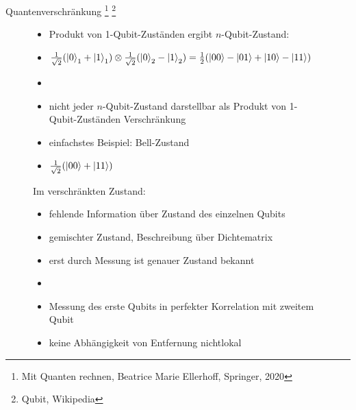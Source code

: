 \documentclass[aspectratio=1610, 9pt]{beamer}
\begin{document}
\begin{frame}{Quantenverschränkung \footnote[14]{Mit Quanten rechnen, Beatrice Marie Ellerhoff, Springer, 2020} \footnote[12]{Qubit, Wikipedia} }
  \begin{figure}
    \begin{minipage}{0.49\textwidth}
      \begin{itemize}
        \item Produkt von 1-Qubit-Zuständen ergibt $n$-Qubit-Zustand:
        \item[] $\frac{1}{\sqrt{2}}(\ket{0}_1 + \ket{1}_1) \otimes \frac{1}{\sqrt{2}}(\ket{0}_2 - \ket{1}_2) = \frac{1}{2}(\ket{00}-\ket{01}+\ket{10}-\ket{11} ) $
        \item[]
        \item nicht jeder $n$-Qubit-Zustand darstellbar als Produkt von 1-Qubit-Zuständen \rightarrow Verschränkung
        \item einfachstes Beispiel: Bell-Zustand
        \item[] $\frac{1}{\sqrt{2}}(\ket{00} + \ket{11})$
      \end{itemize}
    \end{minipage}
    \hfill
    \begin{minipage}{0.49\textwidth}
      Im verschränkten Zustand:
      \begin{itemize}
        \item fehlende Information über Zustand des einzelnen Qubits
        \item[\rightarrow] gemischter Zustand, Beschreibung über Dichtematrix
        \item erst durch Messung ist genauer Zustand bekannt
        \item[]
        \item Messung des erste Qubits in perfekter Korrelation mit zweitem Qubit
        \item keine Abhängigkeit von Entfernung \rightarrow nichtlokal
      \end{itemize}
    \end{minipage}
  \end{figure}
\end{frame}
\end{document}
